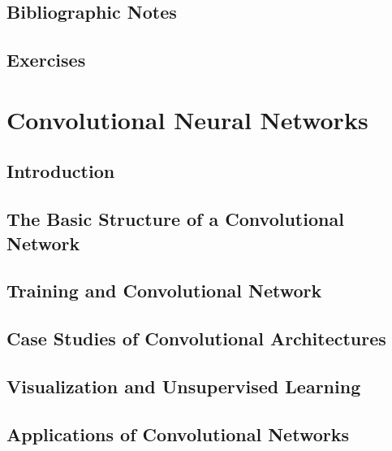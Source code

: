 \documentclass[a4paper]{article}
\begin{document}
\subsection{Bibliographic Notes}

\subsection{Exercises}

\newpage
\section{Convolutional Neural Networks}
\subsection{Introduction}

\subsection{The Basic Structure of a Convolutional Network}

\subsection{Training and Convolutional Network}

\subsection{Case Studies of Convolutional Architectures}

\subsection{Visualization and Unsupervised Learning}

\subsection{Applications of Convolutional Networks}
\end{document}
